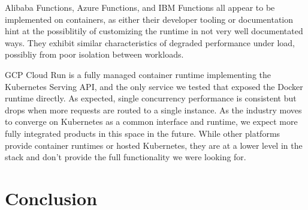 \documentclass[11pt]{article}
\begin{document}
Alibaba Functions, Azure Functions, and IBM Functions
all appear to be implemented on containers,
as either their developer tooling or documentation
hint at the possiblitily of customizing the runtime
in not very well documentated ways.
They exhibit similar characteristics of degraded performance under load,
possibliy from poor isolation between workloads.

GCP Cloud Run is a fully managed container runtime implementing the Kubernetes Serving API,
and the only service we tested that exposed the Docker runtime directly.
As expected, single concurrency performance is consistent
but drops when more requests are routed to a single instance.
As the industry moves to converge on Kubernetes as a common interface and runtime,
we expect more fully integrated products in this space in the future.
While other platforms provide container runtimes or hosted Kubernetes,
they are at a lower level in the stack and don't provide the full functionality we were looking for.



\section{Conclusion}







\end{document}
